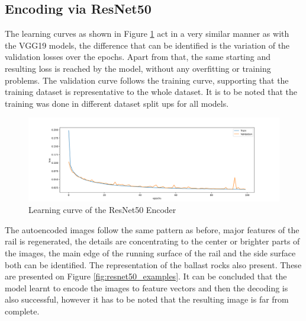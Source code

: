 \subsection{Encoding via ResNet50}
The learning curves as shown in Figure \ref{fig:resnet50_learning_curve} act in a very similar manner
as with the VGG19 models,
the difference that can be identified is the variation of the validation losses over the epochs.
Apart from that, the same starting and resulting loss is reached by the model,
without any overfitting or training problems.
The validation curve follows the training curve, supporting that the training dataset
is representative to the whole dataset.
It is to be noted that the training was done in different dataset split ups for all models.

\begin{figure}[!ht]
    \centering
    \includegraphics[width=\textwidth,trim={0 0 0 1cm},clip]{./results/resnet50_vgg19/20230514_213740_results.png}
    \caption{Learning curve of the ResNet50 Encoder}
    \label{fig:resnet50_learning_curve}
\end{figure}

The autoencoded images follow the same pattern as before, major features of the rail is regenerated,
the details are concentrating to the center or brighter parts of the images,
the main edge of the running surface of the rail and the side surface both can be identified.
The representation of the ballast rocks also present.
These are presented on Figure \ref{fig:resnet50_examples}.
It can be concluded that the model learnt to encode the images to feature vectors and then the
decoding is also successful, however it has to be noted that the resulting image is far from complete.

